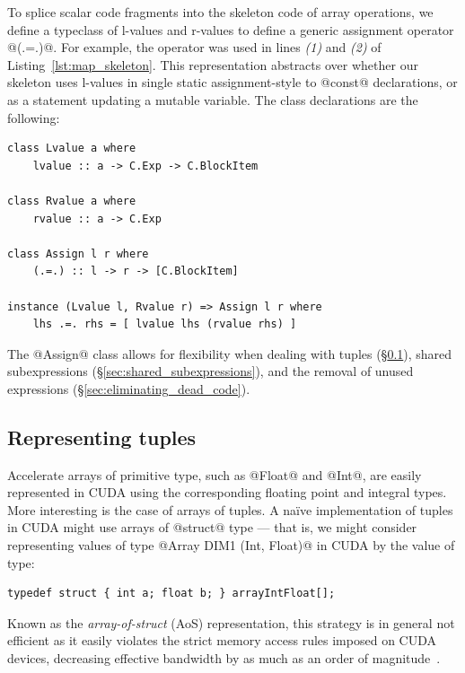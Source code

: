 To splice scalar code fragments into the skeleton code of array operations, we
define a typeclass of l-values and r-values to define a generic assignment
operator @(.=.)@. For example, the operator was used in lines \emph{(1)}
and \emph{(2)} of Listing~\ref{lst:map_skeleton}. This representation abstracts
over whether our skeleton uses l-values in single static assignment-style to
@const@ declarations, or as a statement updating a mutable variable. The
class declarations are the following:
%
\begin{lstlisting}[style=haskell]
class Lvalue a where
    lvalue :: a -> C.Exp -> C.BlockItem

class Rvalue a where
    rvalue :: a -> C.Exp

class Assign l r where
    (.=.) :: l -> r -> [C.BlockItem]

instance (Lvalue l, Rvalue r) => Assign l r where
    lhs .=. rhs = [ lvalue lhs (rvalue rhs) ]
\end{lstlisting}

The @Assign@ class allows for flexibility when dealing with tuples
(\S\ref{sec:representing_tuples}), shared subexpressions
(\S\ref{sec:shared_subexpressions}), and the removal of unused expressions
(\S\ref{sec:eliminating_dead_code}).



\subsection{Representing tuples}
\label{sec:representing_tuples}

Accelerate arrays of primitive type, such as @Float@ and @Int@, are
easily represented in CUDA using the corresponding floating point and integral
types. More interesting is the case of arrays of tuples. A na\"ive
implementation of tuples in CUDA might use arrays of @struct@ type --- that
is, we might consider representing values of type @Array DIM1 (Int, Float)@
in CUDA by the value of type:
%
\begin{lstlisting}[style=cuda]
typedef struct { int a; float b; } arrayIntFloat[];
\end{lstlisting}
%
Known as the \emph{array-of-struct} (AoS)
representation, this strategy is in general not efficient as it easily violates
the strict memory access rules imposed on CUDA devices, decreasing effective
bandwidth by as much as an order of magnitude~\cite{NVIDIA:2012wf}.

